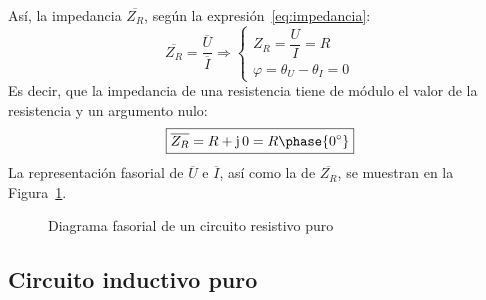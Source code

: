 Así, la impedancia $\overline{Z_R}$, según la
expresión~\eqref{eq:impedancia}:
\begin{equation*}
  \overline{Z_R}=\dfrac{\overline{U}}{\overline{I}}\Rightarrow
  \begin{cases}
    Z_R=\dfrac{U}{I}=R\\
    \varphi=\theta_U-\theta_I=0
  \end{cases}
\end{equation*}
Es decir, que la impedancia de una resistencia tiene de módulo el
valor de la resistencia y un argumento nulo:
\begin{equation}\label{eq:resistencia}
  \boxed{ \overline{Z_R}=R+\mathrm{j}\,0=R\phase{0^\circ}}
\end{equation}
La representación fasorial de $\overline{U}$ e $\overline{I}$, así
como la de $\overline{Z_R}$, se muestran en la
Figura~\ref{fig:fasorResistencia}.
\begin{figure}[H]
  \centering {}\hfil
  \caption{Diagrama fasorial de un circuito resistivo puro}
  \label{fig:fasorResistencia}
\end{figure}
	
\subsection{Circuito inductivo puro}\label{sec:L-puro}
	
